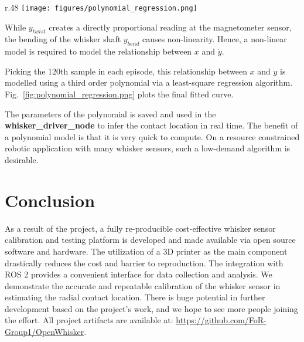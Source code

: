 \documentclass[runningheads]{llncs}
\begin{document}
\begin{wrapfigure}{r}{.48\textwidth}
    \centering
    \texttt{[image: figures/polynomial\_regression.png]}
    \caption{Polynomial Regression of the relationship 100th sample of \(\dot{y}\) in each episode and the contact distance \(x\)}
    \label{fig:polynomial_regression.png}
\end{wrapfigure}

While \(y_{twist}\) creates a directly proportional reading at the magnetometer sensor, the bending of the whisker shaft \(y_{bend}\) causes non-linearity. Hence, a non-linear model is required to model the relationship between \(x\) and \(\dot{y}\).

Picking the 120th sample in each episode, this relationship between \(x\) and \(\dot{y}\) is modelled using a third order polynomial via a least-square regression algorithm. Fig.~\ref*{fig:polynomial_regression.png} plots the final fitted curve.

The parameters of the polynomial is saved and used in the \textbf{whisker\_driver\_node} to infer the contact location in real time. The benefit of a polynomial model is that it is very quick to compute. On a resource constrained robotic application with many whisker sensors, such a low-demand algorithm is desirable.

\section{Conclusion}

As a result of the project, a fully re-producible cost-effective whisker sensor calibration and testing platform is developed and made available via open source software and hardware. The utilization of a 3D printer as the main component drastically reduces the cost and barrier to reproduction. The integration with ROS 2 provides a convenient interface for data collection and analysis. We demonstrate the accurate and repeatable calibration of the whisker sensor in estimating the radial contact location. There is huge potential in further development based on the project's work, and we hope to see more people joining the effort. All project artifacts are available at: \url{https://github.com/FoR-Group1/OpenWhisker}.


\end{document}
